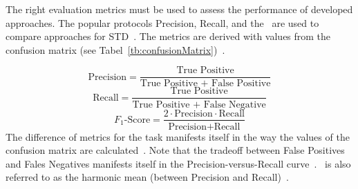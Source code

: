 The right evaluation metrics must be used to assess the performance of developed approaches.
The popular protocols Precision, Recall, and the \fone\ are used to compare
approaches for \ac{STD}~\citep{long_scene_2021}.
The metrics are derived with values from the confusion matrix (see
Tabel~\ref{tb:confusionMatrix})~\citep{davis_relationship_2006}.
\begin{table}[ht]
    \centering\scriptsize
    \caption{Confusion Matrix\label{tb:confusionMatrix}}
\end{table}
\begin{equation}\label{eq:P}
    \text{Precision}=\frac{\text{True Positive}}{\text{True Positive + False Positive}}
\end{equation}
\begin{equation}\label{eq:R}
    \text{Recall}=\frac{\text{True Positive}}{\text{True Positive + False Negative}}
\end{equation}
\begin{equation}\label{eq:f1}
    F_1\text{-Score}=\frac{2\cdot \text{Precision}\cdot \text{Recall}}{\text{Precision}+\text{Recall}}
\end{equation}
The difference of metrics for the task manifests itself in the way the values of the confusion matrix
are calculated~\citep{long_scene_2021}.
Note that the tradeoff between False Positives and Fales Negatives manifests itself in the
Precision-versus-Recall curve~\citep{su_relationship_2015}.
\fone\ is also referred to as the harmonic mean (between Precision and
Recall)~\citep{he_icpr2018_2018}.
